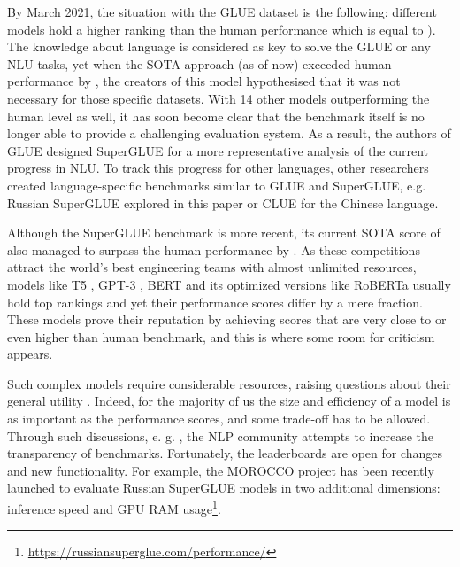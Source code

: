 \documentclass[11pt]{article}
\begin{document}
By March 2021, the situation with the GLUE dataset is the following:  different models hold a higher ranking than the human performance which is equal to  \cite{nangia-bowman-2019-human}). The knowledge about language is considered as key to solve the GLUE or any NLU tasks, yet when the SOTA approach \cite{zhang-etal-2019-ernie} (as of now) exceeded human performance by , the creators of this model hypothesised that it was not necessary for those specific datasets. With 14 other models outperforming the human level as well, it has soon become clear that the benchmark itself is no longer able to provide a challenging evaluation system. As a result, the authors of GLUE designed SuperGLUE \cite{NEURIPS2019_4496bf24} for a more representative analysis of the current progress in NLU. To track this progress for other languages, other researchers created language-specific benchmarks similar to GLUE and SuperGLUE, e.g. Russian SuperGLUE \cite{shavrina-etal-2020-russiansuperglue} explored in this paper or CLUE \cite{xu-etal-2020-clue} for the Chinese language.

Although the SuperGLUE benchmark is more recent, its current SOTA score of  \cite{he2021deberta} also managed to surpass the human performance \cite{NEURIPS2019_4496bf24} by . As these competitions attract the world's best engineering teams with almost unlimited resources, models like T5 \cite{2020t5}, GPT-3 \cite{NEURIPS2020_1457c0d6}, BERT \cite{devlin-etal-2019-bert} and its optimized versions like RoBERTa \cite{liu2019roberta} usually hold top rankings and yet their performance scores differ by a mere fraction. These models prove their reputation by achieving scores that are very close to or even higher than human benchmark, and this is where some room for criticism appears. 

Such complex models require considerable resources, raising questions about their general utility \cite{ethayarajh-jurafsky-2020-utility}. Indeed, for the majority of us the size and efficiency of a model is as important as the performance scores, and some trade-off has to be allowed. Through such discussions, e. g. \cite{Rogers_2019_leaderboards}, the NLP community attempts to increase the transparency of benchmarks. Fortunately, the leaderboards are open for changes and new functionality. For example, the MOROCCO project has been recently launched to evaluate Russian SuperGLUE models in two additional dimensions: inference speed and GPU RAM usage\footnote{\url{https://russiansuperglue.com/performance/}}. 
\end{document}
